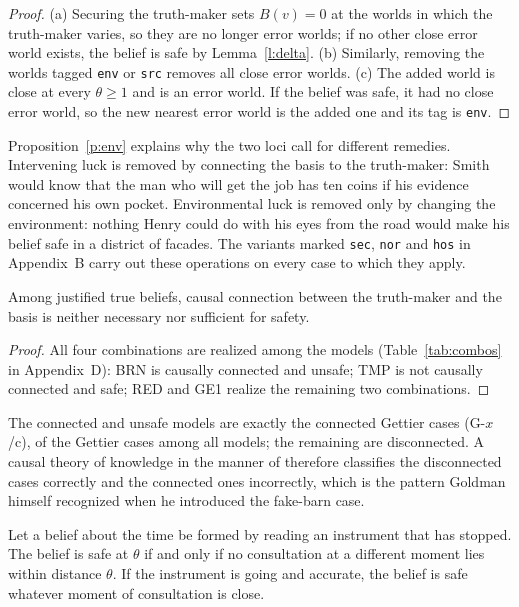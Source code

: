 \documentclass{situationist-preprint}
\begin{document}
\begin{proof}
(a) Securing the truth-maker sets $B(v) = 0$ at the worlds in which the truth-maker varies, so they are no longer error worlds; if no other close error world exists, the belief is safe by Lemma~\ref{l:delta}. (b) Similarly, removing the worlds tagged \texttt{env} or \texttt{src} removes all close error worlds. (c) The added world is close at every $\theta \geq 1$ and is an error world. If the belief was safe, it had no close error world, so the new nearest error world is the added one and its tag is \texttt{env}.
\end{proof}

Proposition~\ref{p:env} explains why the two loci call for different remedies. Intervening luck is removed by connecting the basis to the truth-maker: Smith would know that the man who will get the job has ten coins if his evidence concerned his own pocket. Environmental luck is removed only by changing the environment: nothing Henry could do with his eyes from the road would make his belief safe in a district of facades. The variants marked \texttt{sec}, \texttt{nor} and \texttt{hos} in Appendix~B carry out these operations on every case to which they apply.

\begin{proposition}\label{p:causal}
Among justified true beliefs, causal connection between the truth-maker and the basis is neither necessary nor sufficient for safety.
\end{proposition}

\begin{proof}
All four combinations are realized among the models (Table~\ref{tab:combos} in Appendix~D): BRN is causally connected and unsafe; TMP is not causally connected and safe; RED and GE1 realize the remaining two combinations.
\end{proof}

The connected and unsafe models are exactly the connected Gettier cases (G-$x$/c), \stlocc{} of the \stnG{} Gettier cases among all models; the remaining \stlocd{} are disconnected. A causal theory of knowledge in the manner of \citet{Goldman1967} therefore classifies the disconnected cases correctly and the connected ones incorrectly, which is the pattern Goldman himself recognized when he introduced the fake-barn case.

\begin{proposition}\label{p:temporal}
Let a belief about the time be formed by reading an instrument that has stopped. The belief is safe at $\theta$ if and only if no consultation at a different moment lies within distance $\theta$. If the instrument is going and accurate, the belief is safe whatever moment of consultation is close.
\end{proposition}
\end{document}
